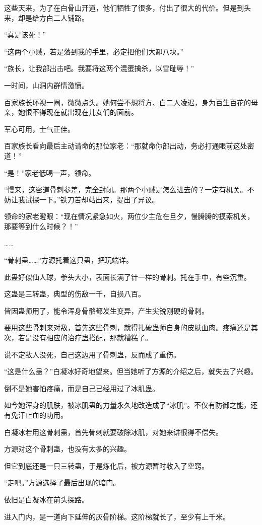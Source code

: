 \begin{this_body}
这些天来，为了在白骨山开道，他们牺牲了很多，付出了很大的代价。但是到头来，却是给方白二人铺路。

“真是该死！”

“这两个小贼，若是落到我的手里，必定把他们大卸八块。”

“族长，让我部出击吧。我要将这两个混蛋擒杀，以雪耻辱！”

一时间，山洞内群情激愤。

百家族长环视一圈，微微点头。她何尝不想将方、白二人凌迟，身为百生百花的母亲，她恨不得现在就出现在儿女们的面前。

军心可用，士气正佳。

百家族长看向最后主动请命的那位家老：“那就命你部出动，务必打通眼前这处密道！”

“是！”家老低喝一声，领命。

“慢来，这密道骨刺参差，完全封闭。那两个小贼是怎么进去的？一定有机关。不妨让我试探一下。”铁刀苦却站出来，提出了异议。

领命的家老瞪眼：“现在情况紧急如火，两位少主危在旦夕，慢腾腾的摸索机关，那要等到什么时候？！”

……

“骨刺蛊……”方源托着这只蛊，把玩端详。

此蛊好似仙人球，拳头大小，表面长满了针一样的骨刺。托在手中，有些沉重。

这蛊是三转蛊，典型的伤敌一千，自损八百。

皆因蛊师用了，能令浑身骨骼都发生变异，产生尖锐刚硬的骨刺。

要用这些骨刺来对敌，首先这些骨刺，就得扎破蛊师自身的皮肤血肉。疼痛还是其次，若是没有相应的治疗蛊搭配，那就糟糕了。

说不定敌人没死，自己这边用了骨刺蛊，反而成了重伤。

“这是什么蛊？”白凝冰好奇地望来。但当她听了方源的介绍之后，就失去了兴趣。

倒不是她害怕疼痛，而是自己已经用过了冰肌蛊。

如今她浑身的肌肤，被冰肌蛊的力量永久地改造成了“冰肌”。不仅有防御之能，还有免汗止血的功用。

白凝冰若用这骨刺蛊，首先骨刺就要破除冰肌，对她来讲很得不偿失。

方源对这个骨刺蛊，也没有太多的兴趣。

但它到底还是一只三转蛊，于是炼化后，被方源暂时收入了空窍。

“走吧。”方源选择了最后出现的暗门。

依旧是白凝冰在前头探路。

进入门内，是一道向下延伸的灰骨阶梯。这阶梯就长了，至少有上千米。


\end{this_body}
